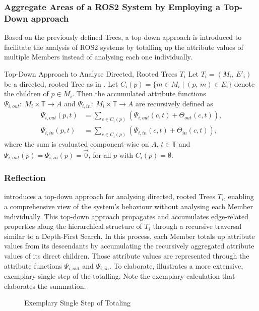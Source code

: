     \subsubsection{Aggregate Areas of a ROS2 System by Employing a Top-Down approach}
    Based on the previously defined Trees, a top-down approach is introduced to facilitate the analysis of ROS2 systems by totalling up the attribute values of multiple Members instead of analysing each one individually.
    \begin{definitionbox}[label=def:topDown, list text={Top-Down Approach to Analyse Directed, Rooted Tree}]{Top-Down Approach to Analyse Directed, Rooted Trees $T_i$}{}
        Let $T_i=(M_i,\,E'_i)$ be a directed, rooted Tree as in .
        Let $C_i(p) = \{m \in M_i \mid (p,\,m) \in E_i\}$ denote the children of $p \in M_i$. 
        Then the accumulated attribute functions $\Psi_{i, out} \colon\: M_i\times\mathbb{T} \to A$ and $\Psi_{i, in} \colon\: M_i\times\mathbb{T} \to A$ are recursively defined as
        \begin{align*}
            \Psi_{i,out}(p,t) &= \sum_{c \in C_i(p)} \left( \Psi_{i,out}(c,t) + \Theta_{out}(c,t) \right) \text{,} \\
            \Psi_{i,in}(p,t) &= \sum_{c \in C_i(p)} \left( \Psi_{i,in}(c,t) + \Theta_{in}(c,t) \right) \text{,}
        \end{align*}
        where the sum is evaluated component-wise on $A$, $t\in\mathbb{T}$  and $\Psi_{i,out}(p)=\Psi_{i,in}(p)=\vec{0}$, for all $p$ with $C_i(p) = \emptyset$.
    \end{definitionbox}


    \subsubsection{Reflection}
     introduces a top-down approach for analysing directed, rooted Trees $T_i$, enabling a comprehensive view of the system's behaviour without analysing each Member individually.
    This top-down approach propagates and accumulates edge-related properties along the hierarchical structure of $T_i$ through a recursive traversal similar to a Depth-First Search. In this process, each Member totals up attribute values from its descendants by accumulating the recursively aggregated attribute values of its direct children. Those attribute values are represented through the attribute functions $\Psi_{i,out}$ and $\Psi_{i,in}$.
    To elaborate,  illustrates a more extensive, exemplary single step of the totalling. Note the exemplary calculation that elaborates the summation.
    \begin{figure}[h]
        \centering
        
        \caption[Exemplary Single Step of Totaling]{Exemplary Single Step of Totaling \legendadapted} \label{fig:tikz:mathModel:topDown}
    \end{figure}

